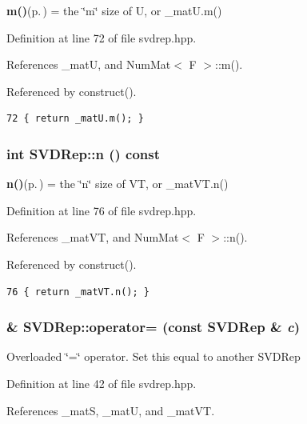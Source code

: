 {\bf m()}{\rm (p.\,\pageref{classSVDRep_6a2fa69c25bf8ed36e019d0fb3f5e966_6a2fa69c25bf8ed36e019d0fb3f5e966})} = the \char`\"{}m\char`\"{} size of U, or \_\-mat\-U.m() 

Definition at line 72 of file svdrep.hpp.

References \_\-mat\-U, and Num\-Mat$<$ F $>$::m().

Referenced by construct().

\footnotesize\begin{verbatim}72 { return _matU.m(); }
\end{verbatim}\normalsize 


\subsubsection{\setlength{\rightskip}{0pt plus 5cm}int SVDRep::n () const\hspace{0.3cm}{\tt  [inline]}}\label{classSVDRep_611a0b095fab035a528671dd8cf7f3b7_611a0b095fab035a528671dd8cf7f3b7}


{\bf n()}{\rm (p.\,\pageref{classSVDRep_611a0b095fab035a528671dd8cf7f3b7_611a0b095fab035a528671dd8cf7f3b7})} = the \char`\"{}n\char`\"{} size of VT, or \_\-mat\-VT.n() 

Definition at line 76 of file svdrep.hpp.

References \_\-mat\-VT, and Num\-Mat$<$ F $>$::n().

Referenced by construct().

\footnotesize\begin{verbatim}76 { return _matVT.n(); }
\end{verbatim}\normalsize 


\subsubsection{\& SVDRep::operator= (const {\bf SVDRep} \& {\em c})\hspace{0.3cm}{\tt  [inline]}}\label{classSVDRep_e5baa23e504aadb012f1c56d8c9a4345_e5baa23e504aadb012f1c56d8c9a4345}


Overloaded \char`\"{}=\char`\"{} operator. Set this equal to another SVDRep 

Definition at line 42 of file svdrep.hpp.

References \_\-mat\-S, \_\-mat\-U, and \_\-mat\-VT.

